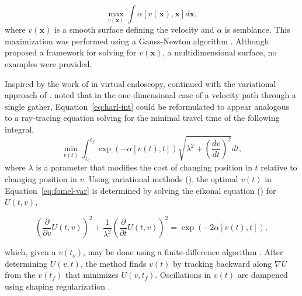 \begin{equation}
\label{eq:harl-int}
\max_{v(\mathbf{x})} \int \alpha \left[v(\mathbf{x}),\mathbf{x} \right] d\mathbf{x},
\end{equation}
where $v(\mathbf{x})$ is a smooth surface defining the velocity and $\alpha$ is semblance.  This maximization was performed using a Gauss-Newton algorithm \cite[]{luenberger-1984}.  Although \cite{harlan-2001} proposed a framework for solving for $v(\mathbf{x})$, a multidimensional surface, no examples were provided.

Inspired by the work of \cite{Deschamps2001FastEO} in virtual endoscopy, \cite{fomelvelanal} continued with the variational approach of \cite{harlan-2001}.  \cite{fomelvelanal} noted that in the one-dimensional case of a velocity path through a single gather, Equation~\ref{eq:harl-int} could be reformulated to appear analogous to a ray-tracing equation solving for the minimal travel time of the following integral,
\begin{equation}
\label{eq:fomel-var}
\min_{v(t)} \int_{t_{o}}^{t_f} \exp \left(- \alpha \left[v(t),t \right] \right)\sqrt{\lambda^2 + \left( \frac{dv}{dt} \right)^2}dt,
\end{equation}
where $\lambda$ is a parameter that modifies the cost of changing position in $t$ relative to changing position in $v$. Using variational methods (\citealp{lanc-1966,greenberg-1978,gelfand-2000}), the optimal $v(t)$ in Equation~\ref{eq:fomel-var} is determined by solving the eikonal equation (\citealp{babich-1972,yilmaz-2001}) for $U(t,v)$,

\begin{equation}
\label{eq:fomel-eik}
\left(\frac{\partial}{\partial v} U(t,v)\right)^2 + \frac{1}{\lambda^2}\left( \frac{\partial}{\partial t} U(t,v)\right)^2 = \exp \left(-2 \alpha \left[v(t),t \right] \right),
\end{equation}

which, given a $v(t_o)$, may be done using a finite-difference algorithm \cite[]{iserles-1996}.  After determining $U(v,t)$, the method finds $v(t)$ by tracking backward along $\nabla U$ from the $v(t_f)$ that minimizes $U(v,t_f)$. 
Oscillations in $v(t)$ are dampened using shaping regularization \cite[]{fomel-2007}.

